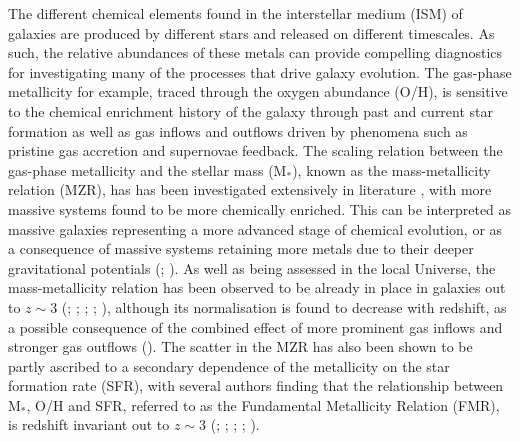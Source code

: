 \documentclass[usenatbib]{mnras} %
\begin{document}

The different chemical elements found in the interstellar medium (ISM) of galaxies are produced by different stars and released on different timescales. As such, the relative abundances of these metals can provide compelling diagnostics for investigating many of the processes that drive galaxy evolution. The gas-phase metallicity for example, traced through the oxygen abundance (O/H), is sensitive to the chemical enrichment history of the galaxy through past and current star formation as well as gas inflows and outflows driven by phenomena such as pristine gas accretion and supernovae feedback. The scaling relation between the gas-phase metallicity and the stellar mass (M$_{*}$), known as the mass-metallicity relation (MZR), has has been investigated extensively in literature \citep[see][for a review]{Maiolino_2019}, with more massive systems found to be more chemically enriched. This can be interpreted as massive galaxies representing a more advanced stage of chemical evolution, or as a consequence of massive systems retaining more metals due to their deeper gravitational potentials (\citealt{Kobayashi_2007}; \citealt{SomervilleDave_2015}). As well as being assessed in the local Universe, the mass-metallicity relation has been observed to be already in place in galaxies out to $z\sim$3 (\citealt{Erb_2006}; \citealt{Maiolino_2008}; \citealt{Troncoso_2014}; \citealt{Mannucci_2009}; \citealt{Sanders_2018}), although its normalisation is found to decrease with redshift, as a possible consequence of the combined effect of more prominent gas inflows and stronger gas outflows (\citealt{Sanders_2020FMR}). The scatter in the MZR has also been shown to be partly ascribed to a secondary dependence of the metallicity on the star formation rate (SFR), with several authors finding that the relationship between M$_{*}$, O/H and SFR, referred to as the Fundamental Metallicity Relation (FMR), is redshift invariant out to $z\sim$3 (\citealt{Mannucci_2010}; \citealt{AndrewsMartini_2013}; \citealt{Cresci_2019}; \citealt{Curti_2020FMR}; \citealt{Sanders_2020FMR}). 
\end{document}
